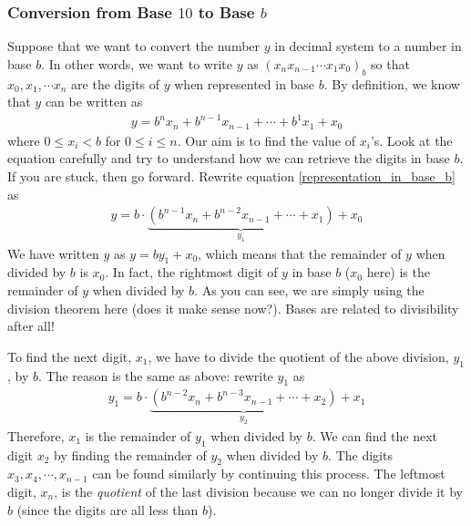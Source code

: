 \documentclass{subfile}
\begin{document}
	\subsubsection{Conversion from Base $10$ to Base $b$}
	Suppose that we want to convert the number $y$ in decimal system to a number in base $b$. In other words, we want to write $y$ as $(x_{n}x_{n-1}\cdots x_1x_0)_b$ so that $x_0, x_1, \cdots x_n$ are the digits of $y$ when represented in base $b$. By definition, we know that $y$ can be written as
	\begin{align}\label{representation_in_base_b}
		y = b^{n} x_{n} + b^{n-1} x_{n-1} + \cdots + b^1x_1 + x_0
	\end{align}
	where $0 \leq x_i < b$ for $0 \leq i \leq n$. Our aim is to find the value of $x_i$'s. Look at the equation carefully and try to understand how we can retrieve the digits in base $b$. If you are stuck, then go forward. Rewrite equation \eqref{representation_in_base_b} as
	\begin{align*}
		y = b \cdot \underbrace{\left( b^{n-1} x_{n} + b^{n-2} x_{n-1} + \cdots + x_1  \right)}_{y_1} + x_0
	\end{align*}
	We have written $y$ as $y=by_1 + x_0$, which means that the remainder of $y$ when divided by $b$ is $x_0$. In fact, the rightmost digit of $y$ in base $b$ ($x_0$ here) is the remainder of $y$ when divided by $b$. As you can see, we are simply using the division theorem here (does it make sense now?). Bases are related to divisibility after all!

	To find the next digit, $x_1$, we have to divide the quotient of the above division, $y_1$, by $b$. The reason is the same as above: rewrite $y_1$ as
	\begin{align*}
		y_1 = b \cdot \underbrace{\left( b^{n-2} x_{n} + b^{n-3} x_{n-1} + \cdots + x_2  \right)}_{y_2} + x_1
	\end{align*}
	Therefore, $x_1$ is the remainder of $y_1$ when divided by $b$. We can find the next digit $x_2$ by finding the remainder of $y_2$ when divided by $b$. The digits $x_3, x_4, \cdots, x_{n-1}$ can be found similarly by continuing this process. The leftmost digit, $x_n$, is the \textit{quotient} of the last division because we can no longer divide it by $b$ (since the digits are all less than $b$).
\end{document}
